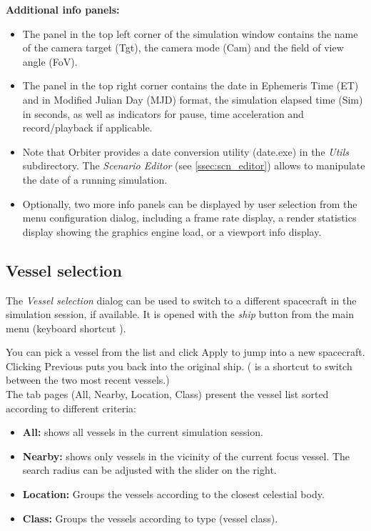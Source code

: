 \documentclass[Orbiter User Manual.tex]{subfiles}
\begin{document}
\noindent
\textbf{Additional info panels:}

\begin{itemize}
\item The panel in the top left corner of the simulation window contains the name of the camera target (Tgt), the camera mode (Cam) and the field of view angle (FoV).
\item The panel in the top right corner contains the date in Ephemeris Time (ET) and in Modified Julian Day (MJD) format, the simulation elapsed time (Sim) in seconds, as well as indicators for pause, time acceleration and record/playback if applicable.
\item Note that Orbiter provides a date conversion utility (date.exe) in the \textit{Utils} subdirectory. The \textit{Scenario Editor} (see \ref{ssec:scn_editor}) allows to manipulate the date of a running simulation.
\item Optionally, two more info panels can be displayed by user selection from the menu configuration dialog, including a frame rate display, a render statistics display showing the graphics engine load, or a viewport info display.
\end{itemize}


\subsection{Vessel selection}
\label{ssec:menu_vessel_sel}
The \textit{Vessel selection} dialog can be used to switch to a different spacecraft in the simulation session, if available. It is opened with the \textit{ship} button from the main menu (keyboard shortcut ).

\begin{figure}[H]
	\centering
\end{figure}

\noindent
You can pick a vessel from the list and click Apply to jump into a new spacecraft. Clicking Previous puts you back into the original ship. (\Ctrl{} is a shortcut to switch between the two most recent vessels.)\\
The tab pages (All, Nearby, Location, Class) present the vessel list sorted according to different criteria:

\begin{itemize}
\item \textbf{All:} shows all vessels in the current simulation session.
\item \textbf{Nearby:} shows only vessels in the vicinity of the current focus vessel. The search radius can be adjusted with the slider on the right.
\item \textbf{Location:} Groups the vessels according to the closest celestial body.
\item \textbf{Class:} Groups the vessels according to type (vessel class).
\end{itemize}
\end{document}
